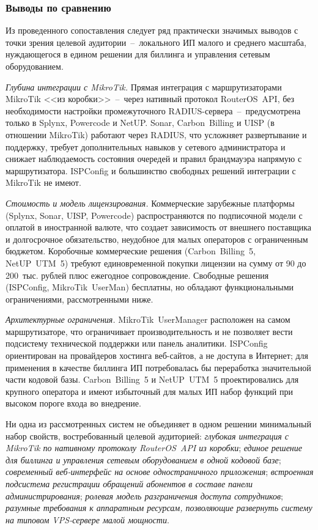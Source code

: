 \subsubsection{Выводы по сравнению}

Из проведенного сопоставления следует ряд практически значимых выводов с точки зрения целевой аудитории~--~локального ИП малого и среднего масштаба, нуждающегося в едином решении для биллинга и управления сетевым оборудованием.

\emph{Глубина интеграции с MikroTik.} Прямая интеграция с маршрутизаторами MikroTik <<из коробки>>~--~через нативный протокол RouterOS~API, без необходимости настройки промежуточного RADIUS-сервера~--~предусмотрена только в Splynx, Powercode и NetUP. Sonar, Carbon~Billing и UISP (в отношении MikroTik) работают через RADIUS, что усложняет развертывание и поддержку, требует дополнительных навыков у сетевого администратора и снижает наблюдаемость состояния очередей и правил брандмауэра напрямую с маршрутизатора. ISPConfig и большинство свободных решений интеграции с MikroTik не имеют.

\emph{Стоимость и модель лицензирования.} Коммерческие зарубежные платформы (Splynx, Sonar, UISP, Powercode) распространяются по подписочной модели с оплатой в иностранной валюте, что создает зависимость от внешнего поставщика и долгосрочное обязательство, неудобное для малых операторов с ограниченным бюджетом. Коробочные коммерческие решения (Carbon~Billing~5, NetUP~UTM~5) требуют единовременной покупки лицензии на сумму от 90 до 200~тыс. рублей плюс ежегодное сопровождение. Свободные решения (ISPConfig, MikroTik~UserMan) бесплатны, но обладают функциональными ограничениями, рассмотренными ниже.

\emph{Архитектурные ограничения.} MikroTik~UserManager расположен на самом маршрутизаторе, что ограничивает производительность и не позволяет вести подсистему технической поддержки или панель аналитики. ISPConfig ориентирован на провайдеров хостинга веб-сайтов, а не доступа в Интернет; для применения в качестве биллинга ИП потребовалась бы переработка значительной части кодовой базы. Carbon~Billing~5 и NetUP~UTM~5 проектировались для крупного оператора и имеют избыточный для малых ИП набор функций при высоком пороге входа во внедрение.

Ни одна из рассмотренных систем не объединяет в одном решении минимальный набор свойств, востребованный целевой аудиторией: \emph{глубокая интеграция с MikroTik по нативному протоколу RouterOS~API из коробки}; \emph{единое решение для биллинга и управления сетевым оборудованием в одной кодовой базе}; \emph{современный веб-интерфейс на основе одностраничного приложения}; \emph{встроенная подсистема регистрации обращений абонентов в составе панели администрирования}; \emph{ролевая модель разграничения доступа сотрудников}; \emph{разумные требования к аппаратным ресурсам, позволяющие развернуть систему на типовом VPS-сервере малой мощности}.

